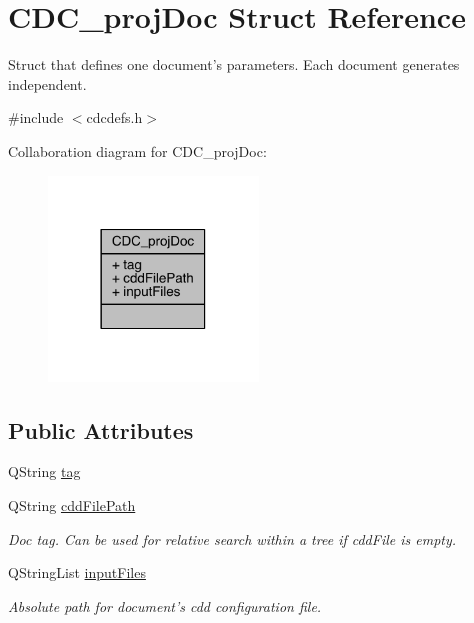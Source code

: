 \hypertarget{struct_c_d_c__proj_doc}{\section{C\+D\+C\+\_\+proj\+Doc Struct Reference}
\label{struct_c_d_c__proj_doc}
}


Struct that defines one document's parameters. Each document generates independent.  




{\ttfamily \#include $<$cdcdefs.\+h$>$}



Collaboration diagram for C\+D\+C\+\_\+proj\+Doc\+:\nopagebreak
\begin{figure}[H]
\begin{center}
\leavevmode
\includegraphics[width=158pt]{struct_c_d_c__proj_doc__coll__graph}
\end{center}
\end{figure}
\subsection*{Public Attributes}
\begin{DoxyCompactItemize}
\item 
Q\+String \hyperlink{struct_c_d_c__proj_doc_afcd597894a882dfe594315a3930bc492}{tag}
\item 
Q\+String \hyperlink{struct_c_d_c__proj_doc_a4f3700af6b69bfc6188c414ff91be1a5}{cdd\+File\+Path}
\begin{DoxyCompactList}\small\item\em Doc tag. Can be used for relative search within a tree if cdd\+File is empty. \end{DoxyCompactList}\item 
Q\+String\+List \hyperlink{struct_c_d_c__proj_doc_a0edefa609111f55b1a8bbef4493ef3f3}{input\+Files}
\begin{DoxyCompactList}\small\item\em Absolute path for document's cdd configuration file. \end{DoxyCompactList}\end{DoxyCompactItemize}


